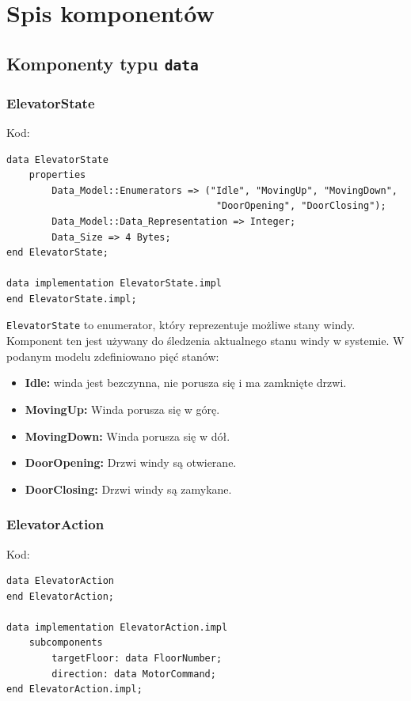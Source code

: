 \documentclass{article}
\begin{document}
\section{Spis komponentów}

\subsection{Komponenty typu \texttt{data}}

\subsubsection{ElevatorState}

Kod:

    \begin{lstlisting}[basicstyle=\ttfamily, keywordstyle=\bfseries]
data ElevatorState
    properties
        Data_Model::Enumerators => ("Idle", "MovingUp", "MovingDown",
                                     "DoorOpening", "DoorClosing");
        Data_Model::Data_Representation => Integer;
        Data_Size => 4 Bytes;
end ElevatorState;

data implementation ElevatorState.impl
end ElevatorState.impl;
    \end{lstlisting}

    \texttt{ElevatorState} to enumerator, który reprezentuje możliwe stany windy. Komponent ten jest używany do śledzenia aktualnego stanu windy w systemie. W podanym modelu zdefiniowano pięć stanów:

    \begin{itemize}
        \item \textbf{Idle:} winda jest bezczynna, nie porusza się i ma zamknięte drzwi.
        \item \textbf{MovingUp:} Winda porusza się w górę.
        \item \textbf{MovingDown:} Winda porusza się w dół.
        \item \textbf{DoorOpening:} Drzwi windy są otwierane.
        \item \textbf{DoorClosing:} Drzwi windy są zamykane.
    \end{itemize}



    \subsubsection{ElevatorAction}

Kod:

    \begin{lstlisting}[basicstyle=\ttfamily, keywordstyle=\bfseries]
data ElevatorAction
end ElevatorAction;

data implementation ElevatorAction.impl
    subcomponents
        targetFloor: data FloorNumber;
        direction: data MotorCommand;
end ElevatorAction.impl;
    \end{lstlisting}
\end{document}

